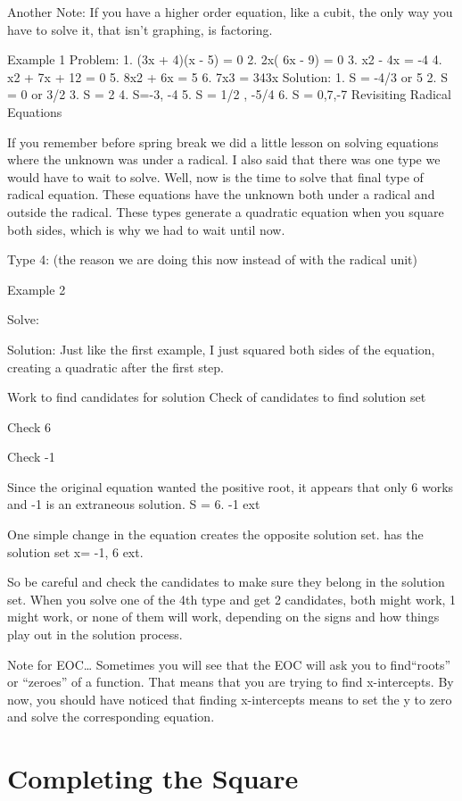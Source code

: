 Another Note: If you have a higher order equation, like a cubit, the only way you have to solve it, that isn't graphing, is factoring. 

Example 1
Problem: 
1. (3x + 4)(x - 5) = 0
2. 2x( 6x - 9) = 0
3. x2 - 4x = -4
4. x2 + 7x + 12 = 0
5. 8x2 + 6x = 5
6. 7x3 = 343x
Solution:
1. S = {-4/3 or 5}
2. S = {0 or 3/2}
3. S = {2}
4. S={-3, -4}
5. S ={ 1/2 , -5/4}
6. S = {0,7,-7}
Revisiting Radical Equations

If you remember before spring break we did a little lesson on solving equations where the unknown was under a radical. I also said that there was one type we would have to wait to solve. Well, now is the time to solve that final type of radical equation. These equations have the unknown both under a radical and outside the radical. These types generate a quadratic equation when you square both sides, which is why we had to wait until now.

Type 4: (the reason we are doing this now instead of with the radical unit)

Example 2

Solve: 

Solution: Just like the first example, I just squared both sides of the equation, creating a quadratic after the first step.

Work to find candidates for solution
Check of candidates to find solution set

Check 6


Check -1


Since the original equation wanted the positive root, it appears that only 6 works and -1 is an extraneous solution. S = {6}. -1 ext

One simple change in the equation creates the opposite solution set. has the solution set x= {-1}, 6 ext.

So be careful and check the candidates to make sure they belong in the solution set. When you solve one of the 4th type and get 2 candidates, both might work, 1 might work, or none of them will work, depending on the signs and how things play out in the solution process.

Note for EOC\ldots{} Sometimes you will see that the EOC will ask you to find``roots'' or ``zeroes'' of a function. That means that you are trying to find x-intercepts. By now, you should have noticed that finding x-intercepts means to set the y to zero and solve the corresponding equation.


\section{Completing the Square}

